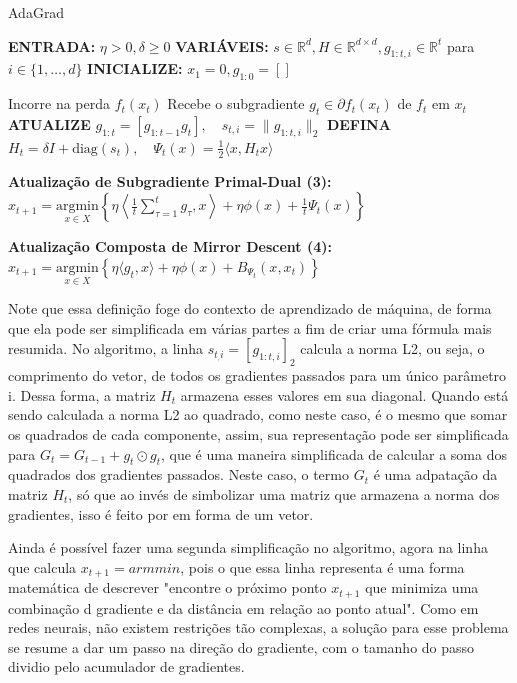 \begin{algorithm}[H]
    \caption{AdaGrad}
    \label{alg:adagrad}
    \begin{algorithmic}[1]

    \State \textbf{ENTRADA:} $\eta > 0, \delta \ge 0$
    \State \textbf{VARIÁVEIS:} $s \in \mathbb{R}^d, H \in \mathbb{R}^{d \times d}, g_{1:t,i} \in \mathbb{R}^t$ para $i \in \{1,\dots,d\}$
    \State \textbf{INICIALIZE:} $x_1 = 0, g_{1:0} = []$

        \State Incorre na perda $f_t(x_t)$
        \State Recebe o subgradiente $g_t \in \partial f_t(x_t)$ de $f_t$ em $x_t$
        \State \textbf{ATUALIZE} $g_{1:t} = [g_{1:t-1} g_t], \quad s_{t,i} = \|g_{1:t,i}\|_2$
        \State \textbf{DEFINA} $H_t = \delta I + \text{diag}(s_t), \quad \Psi_t(x) = \frac{1}{2}\langle x, H_t x \rangle$
    \EndFor

    \State
    \State \textbf{Atualização de Subgradiente Primal-Dual (3):}
    \State $x_{t+1} = \underset{x \in X}{\text{argmin}} \left\{ \eta \left\langle \frac{1}{t} \sum_{\tau=1}^t g_\tau, x \right\rangle + \eta \phi(x) + \frac{1}{t} \Psi_t(x) \right\}$

    \State
    \State \textbf{Atualização Composta de Mirror Descent (4):}
    \State $x_{t+1} = \underset{x \in X}{\text{argmin}} \left\{ \eta \langle g_t, x \rangle + \eta \phi(x) + B_{\Psi_t}(x, x_t) \right\}$

    \end{algorithmic}
\end{algorithm}

Note que essa definição foge do contexto de aprendizado de máquina, de forma que ela pode ser simplificada em várias partes a fim de criar uma fórmula mais resumida. No algoritmo, a linha $s_{t_,i} = [g_{1:t,i}]_2$ calcula a norma L2, ou seja, o comprimento do vetor, de todos os gradientes passados para um único parâmetro i. Dessa forma, a matriz $H_t$ armazena esses valores em sua diagonal. Quando está sendo calculada a norma L2 ao quadrado, como neste caso, é o mesmo que somar os quadrados de cada componente, assim, sua representação pode ser simplificada para $G_t = G_{t-1} + g_t \odot g_t$, que é uma maneira simplificada de calcular a soma dos quadrados dos gradientes passados. Neste caso, o termo $G_t$ é uma adpatação da matriz $H_t$, só que ao invés de simbolizar uma matriz que armazena a norma dos gradientes, isso é feito por em forma de um vetor.

Ainda é possível fazer uma segunda simplificação no algoritmo, agora na linha que calcula $x_{t+1} = armmin{}$, pois o que essa linha representa é uma forma matemática de descrever "encontre o próximo ponto $x_{t+1}$ que minimiza uma combinação d gradiente e da distância em relação ao ponto atual". Como em redes neurais, não existem restrições tão complexas, a solução para esse problema se resume a dar um passo na direção do gradiente, com o tamanho do passo dividio pelo acumulador de gradientes.

